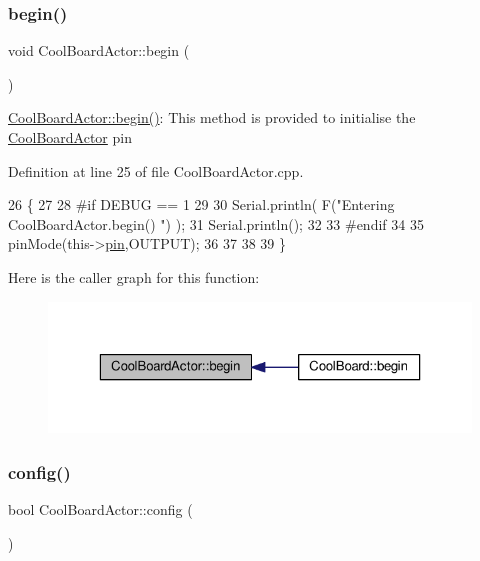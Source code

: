 \subsubsection{\texorpdfstring{begin()}{begin()}}
{\footnotesize\ttfamily void Cool\+Board\+Actor\+::begin (\begin{DoxyParamCaption}{ }\end{DoxyParamCaption})}

\hyperlink{class_cool_board_actor_a7f4422fd85a5510bc2cdfd68e109be5e}{Cool\+Board\+Actor\+::begin()}\+: This method is provided to initialise the \hyperlink{class_cool_board_actor}{Cool\+Board\+Actor} pin 

Definition at line 25 of file Cool\+Board\+Actor.\+cpp.


\begin{DoxyCode}
26 \{
27 
28 \textcolor{preprocessor}{#if DEBUG == 1 }
29  
30     Serial.println( F(\textcolor{stringliteral}{"Entering CoolBoardActor.begin() "}) );
31     Serial.println();
32 
33 \textcolor{preprocessor}{#endif}
34 
35     pinMode(this->\hyperlink{class_cool_board_actor_a8b5c0b41fe6033b68d9e1ed00bc2e122}{pin},OUTPUT);
36     
37     
38 
39 \}
\end{DoxyCode}
Here is the caller graph for this function\+:
\nopagebreak
\begin{figure}[H]
\begin{center}
\leavevmode
\includegraphics[width=323pt]{dc/d69/class_cool_board_actor_a7f4422fd85a5510bc2cdfd68e109be5e_icgraph}
\end{center}
\end{figure}
\mbox{\label{class_cool_board_actor_a5af5538fc7d169f63127e06d5219bcd4}} 
\subsubsection{\texorpdfstring{config()}{config()}}
{\footnotesize\ttfamily bool Cool\+Board\+Actor\+::config (\begin{DoxyParamCaption}{ }\end{DoxyParamCaption})}

